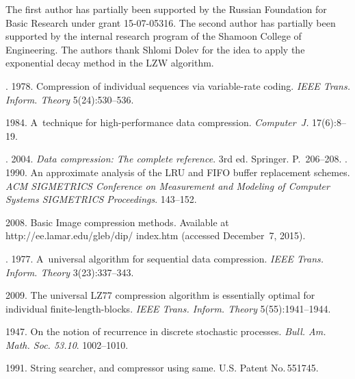 \begin{multicols}{2}
\vspace*{-6pt}

\Ack
\noindent
The first author has partially been supported by the Russian Foundation 
for Basic Research under grant 15-07-05316. The second author has 
partially been supported by the internal research program of the Shamoon College 
of Engineering.
The authors thank Shlomi Dolev for the idea to apply the exponential decay method 
in the {LZW} algorithm. 

\renewcommand{\bibname}{\protect\rmfamily References}



{\small\frenchspacing
{%
\begin{thebibliography}{99}

. 1978. 
Compression of individual sequences via
variable-rate coding. \textit{IEEE Trans. Inform. Theory} 5(24):530--536.

 1984. A~technique for high-performance data compression. 
\textit{Computer~J.} 17(6):8--19.


. 2004. 
\textit{Data compression: The
complete reference}. 3rd ed. Springer. P.~206--208.
. 1990. 
An approximate analysis of the LRU and FIFO buffer replacement schemes. 
\textit{ACM SIGMETRICS Conference on Measurement and Modeling of Computer
 Systems SIGMETRICS Proceedings}. 143--152.

 2008. Basic Image compression methods. 
Available at {\sf http://ee.lamar.edu/gleb/dip/ index.htm}
(accessed December~7, 2015).


. 1977. 
A~universal algorithm for sequential data compression. 
\textit{IEEE Trans. Inform. Theory} 3(23):337--343.





 2009. The universal LZ77 compression algorithm is essentially optimal 
for individual finite-length-blocks. \textit{IEEE Trans. Inform. Theory} 
5(55):1941--1944.

 1947. 
On the notion of recurrence in discrete stochastic processes. 
\textit{Bull. Am. Math. Soc. 53.10}. 1002--1010.

 1991. String searcher, and compressor using same. 
{U.S. Patent No.\,551745}.


\end{thebibliography}}}
\end{multicols}
